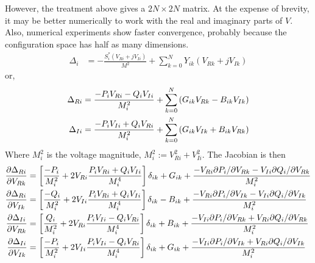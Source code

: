 \documentclass[11pt]{article}
\begin{document}
However, the treatment above gives a $2N \times 2N$ matrix. At the expense of brevity, it may be better numerically to work with the real and imaginary parts of $V$. Also, numerical experiments show faster convergence, probably because the configuration space has half as many dimensions.
\begin{align}
\Delta_i &= -\frac{S^*_i\left(V_{Ri}+jV_{Ii}\right)}{M^2} + \sum_{k=0}^NY_{ik}\left(V_{Rk} + j V_{Ik}\right)
\end{align}
or,
\begin{align}
\Delta_{Ri} &= \frac{-P_iV_{Ri}-Q_iV_{Ii}}{M^2_i} + \sum_{k=0}^N\left(G_{ik}V_{Rk} - B_{ik}V_{Ik}\right)\notag \\
\Delta_{Ii} &= \frac{-P_iV_{Ii}+Q_iV_{Ri}}{M^2_i} + \sum_{k=0}^N\left(G_{ik}V_{Ik} + B_{ik}V_{Rk}\right)
\end{align}
Where $M^2_i$ is the voltage magnitude, $M^2_i := V_{Ri}^2 + V_{Ii}^2$. The Jacobian is then
\begin{align}
\frac{\partial \Delta_{Ri}}{\partial V_{Rk}} &= \left[\frac{-P_i}{M^2_i} + 2V_{Ri}\frac{P_iV_{Ri} + Q_iV_{Ii}}{M^4_i}\right]\delta_{ik}+G_{ik} 
+\frac{-V_{Ri}\partial P_i/\partial V_{Rk}-V_{Ii}\partial Q_i/\partial V_{Rk}}{M^2_i}\notag \\
\frac{\partial \Delta_{Ri}}{\partial V_{Ik}} &= \left[\frac{-Q_i}{M^2_i} + 2V_{Ii}\frac{P_iV_{Ri} + Q_iV_{Ii}}{M^4_i}\right]\delta_{ik}-B_{ik}
+\frac{-V_{Ri}\partial P_i/\partial V_{Ik}-V_{Ii}\partial Q_i/\partial V_{Ik}}{M^2_i}\notag \\
\frac{\partial \Delta_{Ii}}{\partial V_{Rk}} &= \left[\frac{Q_i}{M^2_i} + 2V_{Ri}\frac{P_iV_{Ii} - Q_iV_{Ri}}{M^4_i}\right]\delta_{ik}+B_{ik}
+\frac{-V_{Ii}\partial P_i/\partial V_{Rk}+V_{Ri}\partial Q_i/\partial V_{Rk}}{M^2_i} \notag \\
\frac{\partial \Delta_{Ii}}{\partial V_{Ik}} &= \left[\frac{-P_i}{M^2_i} + 2V_{Ii}\frac{P_iV_{Ii} - Q_iV_{Ri}}{M^4_i}\right]\delta_{ik}+G_{ik}
+\frac{-V_{Ii}\partial P_i/\partial V_{Ik}+V_{Ri}\partial Q_i/\partial V_{Ik}}{M^2_i}
\end{align}
\end{document}
